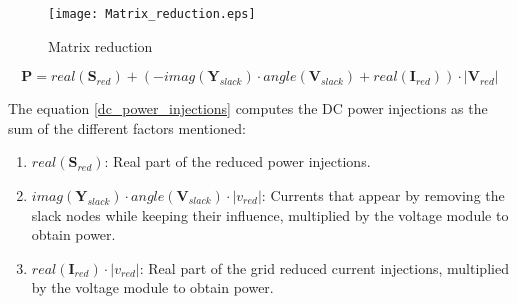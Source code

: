 \documentclass[11pt,fleqn]{book} %
\begin{document}
\begin{figure}[h!]
	\centering
	\texttt{[image: Matrix\_reduction.eps]}
	\caption{Matrix reduction}
	\label{fig:Matrix_reduction}
\end{figure}

%
%
%
%
%
%
%
%
%

\begin{equation}
\textbf{P} = real(\textbf{S}_{red}) + (- imag(\textbf{Y}_{slack}) \cdot angle(\textbf{V}_{slack}) + real(\textbf{I}_{red})) \cdot |\textbf{V}_{red}|
\label{dc_power_injections}
\end{equation}

The equation \ref{dc_power_injections} computes the DC power injections as the sum of the different factors mentioned:

\begin{enumerate}
	\item $real(\textbf{S}_{red})$: Real part of the reduced power injections.
	\item $imag(\textbf{Y}_{slack}) \cdot angle(\textbf{V}_{slack}) \cdot |v_{red}|$: Currents that appear by removing the slack nodes while keeping their influence, multiplied by the voltage module to obtain power.
	\item $real(\textbf{I}_{red}) \cdot |v_{red}|$: Real part of the grid reduced current injections, multiplied by the voltage module to obtain power.
\end{enumerate}
\end{document}
